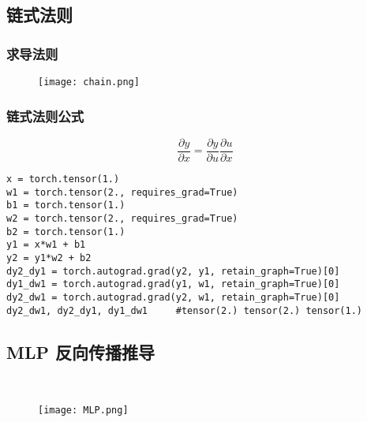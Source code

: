 \subsection{链式法则}
\subsubsection{求导法则}
\begin{figure}[!h]
  \centering
  \texttt{[image: chain.png]}
\end{figure}

\subsubsection{链式法则公式}

$$\frac{\partial y}{\partial x} = \frac{\partial y}{\partial u}\frac{\partial u}{\partial x}$$

\begin{lstlisting}
x = torch.tensor(1.)
w1 = torch.tensor(2., requires_grad=True)
b1 = torch.tensor(1.)
w2 = torch.tensor(2., requires_grad=True)
b2 = torch.tensor(1.)
y1 = x*w1 + b1
y2 = y1*w2 + b2
dy2_dy1 = torch.autograd.grad(y2, y1, retain_graph=True)[0]
dy1_dw1 = torch.autograd.grad(y1, w1, retain_graph=True)[0]
dy2_dw1 = torch.autograd.grad(y2, w1, retain_graph=True)[0]
dy2_dw1, dy2_dy1, dy1_dw1     #tensor(2.) tensor(2.) tensor(1.)
\end{lstlisting}


\subsection{MLP 反向传播推导}
~\\
\begin{figure}[!h]
  \centering
  \texttt{[image: MLP.png]}
\end{figure}

